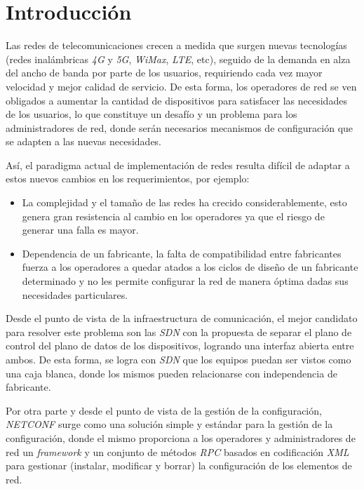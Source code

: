 
\chapter{Introducción} %

\label{Chapter1} %

Las redes de telecomunicaciones crecen a medida que surgen nuevas tecnologías (redes inalámbricas \textit{4G} y \textit{5G}, \textit{WiMax}, \textit{LTE}, etc), seguido de la demanda en alza del ancho de banda por parte de los usuarios, requiriendo cada vez mayor velocidad y mejor calidad de servicio. De esta forma, los operadores de red se ven obligados a aumentar la cantidad de dispositivos para satisfacer las necesidades de los usuarios, lo que constituye un desafío y un problema para los administradores de red, donde serán necesarios mecanismos de configuración que se adapten a las nuevas necesidades. 

Así, el paradigma actual de implementación de redes resulta difícil de adaptar a estos nuevos cambios en los requerimientos, por ejemplo:

\begin{itemize}     
    \item La complejidad y el tamaño de las redes ha crecido considerablemente, esto genera gran resistencia al cambio en los operadores ya que el riesgo de generar una falla es mayor.

    \item Dependencia  de  un  fabricante,  la  falta  de  compatibilidad  entre  fabricantes fuerza a los operadores a quedar atados a los ciclos de diseño de un fabricante determinado y no les permite configurar la red de manera óptima dadas sus necesidades particulares. 
\end{itemize}

Desde el punto de vista de la infraestructura de comunicación, el mejor candidato para resolver este problema son las \textit{SDN} con la propuesta de separar el plano de control del plano de datos de los dispositivos, logrando una interfaz abierta entre ambos. De esta forma, se logra con \textit{SDN} que los equipos puedan ser vistos como una caja blanca, donde los mismos pueden relacionarse con independencia de fabricante. 

Por otra parte y desde el punto de vista de la gestión de la configuración, \textit{NETCONF} surge como una solución simple y estándar para la gestión de la configuración, donde el mismo proporciona a los operadores y administradores de red un \textit{framework} y un conjunto de métodos \textit{RPC} basados en codificación \textit{XML} para gestionar (instalar, modificar y borrar) la configuración de los elementos de red.


